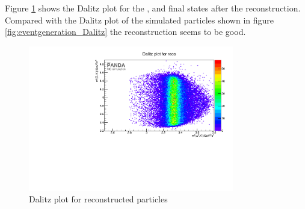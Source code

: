 	Figure \ref{fig:reco_Dalitzplot} shows the Dalitz plot for the \anticascade, \lam and \kminus final states after the reconstruction. 
	Compared with the Dalitz plot of the simulated particles shown in figure \ref{fig:eventgeneration_Dalitz} the reconstruction seems to be good.
	
	\begin{figure}
		\centering
		\includegraphics[width=0.8\textwidth]{./plots/pbarp/Dalitzplot_reco.pdf}
		\caption{\propose Dalitz plot for reconstructed particles}
		\label{fig:reco_Dalitzplot}
	
	\end{figure}
	
	